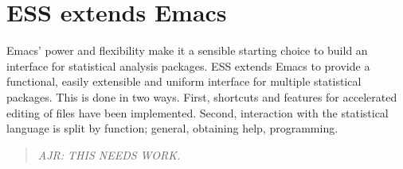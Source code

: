 \documentclass{article}
\newcommand{\stexttt}[1]{{\small\texttt{#1}}}
\newenvironment{Comment}{\begin{quote}\small\itshape }{\end{quote}}
\begin{document}
\section{ESS extends Emacs}
\label{sec:ess-extends-emacs}

Emacs' power and flexibility make it a sensible starting choice to
build an interface for statistical analysis packages.  ESS extends
Emacs to provide a functional, easily extensible and uniform interface
for multiple statistical packages.  This is done in two ways.  First,
shortcuts and features for accelerated editing of files have been
implemented.  Second, interaction with the statistical
language is split by function; general, obtaining help, programming.

\begin{Comment}
AJR: THIS NEEDS WORK.
\end{Comment}





\end{document}
